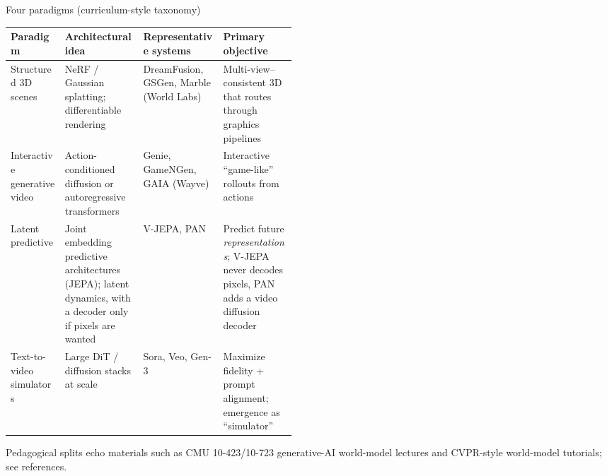 \begin{frame}{Four paradigms (curriculum-style taxonomy)}
  \tiny
  \setlength{\tabcolsep}{3pt}
  \renewcommand{\arraystretch}{1.15}
  \begin{tabularx}{\linewidth}{@{} >{\raggedright\arraybackslash}p{0.19\linewidth} >{\raggedright\arraybackslash}X >{\raggedright\arraybackslash}p{0.28\linewidth} >{\raggedright\arraybackslash}X @{}}
    \toprule
    \textbf{Paradigm} & \textbf{Architectural idea} & \textbf{Representative systems} & \textbf{Primary objective} \\
    \midrule
    Structured 3D scenes & NeRF / Gaussian splatting; differentiable rendering & DreamFusion, GSGen, Marble (World Labs) & Multi-view--consistent 3D that routes through graphics pipelines \\
    \midrule
    Interactive generative video & Action-conditioned diffusion or autoregressive transformers & Genie, GameNGen, GAIA (Wayve) & Interactive ``game-like'' rollouts from actions \\
    \midrule
    Latent predictive & Joint embedding predictive architectures (JEPA); latent dynamics, with a decoder only if pixels are wanted & V-JEPA, PAN & Predict future \emph{representations}; V-JEPA never decodes pixels, PAN adds a video diffusion decoder \\
    \midrule
    Text-to-video simulators & Large DiT / diffusion stacks at scale & Sora, Veo, Gen-3 & Maximize fidelity + prompt alignment; emergence as ``simulator'' \\
    \bottomrule
  \end{tabularx}
  \vspace{0.35em}
  {\scriptsize Pedagogical splits echo materials such as CMU 10-423/10-723 generative-AI world-model lectures and CVPR-style world-model tutorials; see references.}
\end{frame}
